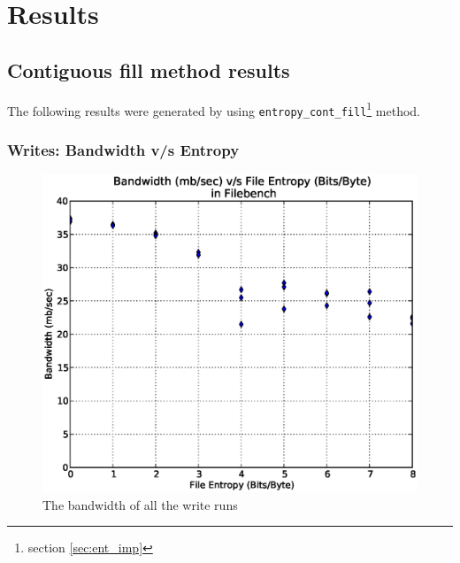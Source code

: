 \chapter{Results}\label{chap:res}

\section{Contiguous fill method results}

The following results were generated by using \verb+entropy_cont_fill+\footnote{section \ref{sec:ent_imp}} method.

\subsection{Writes: Bandwidth v/s Entropy}
\begin{figure}[H]
\begin{center}
\includegraphics[scale=.55]{../results/set1/write_bw_all.eps}
\caption{The bandwidth of all the write runs}
\label{fig:wb}
\end{center}
\end{figure}

